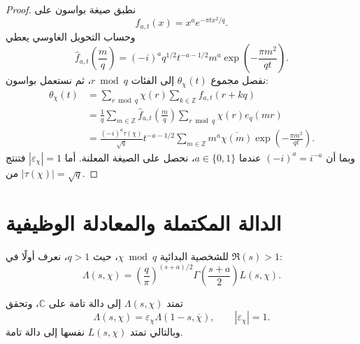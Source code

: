 \begin{proof}
نطبق صيغة بواسون على
\[
f_{a,t}(x)=x^a e^{-\pi tx^2/q}.
\]
وحساب التحويل الغاوسي يعطي
\[
\widehat f_{a,t}\!\left(\frac mq\right)
=
(-i)^a q^{1/2}t^{-a-1/2}m^a
\exp\!\left(-\frac{\pi m^2}{qt}\right).
\]
نفصل مجموع \(\theta_\chi(t)\) إلى الفئات \(r\bmod q\)، ثم نستعمل
بواسون:
\begin{align*}
\theta_\chi(t)
&=
\sum_{r\bmod q}\chi(r)
\sum_{k\in\mathbb Z}f_{a,t}(r+kq)\\
&=
\frac1q\sum_{m\in\mathbb Z}
\widehat f_{a,t}\!\left(\frac mq\right)
\sum_{r\bmod q}\chi(r)e_q(mr)\\
&=
\frac{(-i)^a\tau(\chi)}{\sqrt q}
 t^{-a-1/2}
\sum_{m\in\mathbb Z}m^a\overline{\chi(m)}
\exp\!\left(-\frac{\pi m^2}{qt}\right).
\end{align*}
وبما أن \((-i)^a=i^{-a}\) عندما \(a\in\{0,1\}\)، نحصل على الصيغة
المعلنة. أما \(|\varepsilon_\chi|=1\) فتنتج من
\(|\tau(\chi)|=\sqrt q\).
\end{proof}

\section{الدالة المكتملة والمعادلة الوظيفية}

للشخصية البدائية \(\chi\bmod q\)، حيث \(q>1\)، نعرف أولًا في
\(\Re(s)>1\):
\[
\Lambda(s,\chi)
=
\left(\frac q\pi\right)^{(s+a)/2}
\Gamma\!\left(\frac{s+a}{2}\right)L(s,\chi).
\]

\begin{theorem}
\label{thm:primitive-l-functional-equation}
\provedhere
تمتد \(\Lambda(s,\chi)\) إلى دالة تامة على \(\mathbb C\)، وتحقق
\[
\Lambda(s,\chi)
=
\varepsilon_\chi
\Lambda(1-s,\overline\chi),
\qquad
|\varepsilon_\chi|=1.
\]
وبالتالي تمتد \(L(s,\chi)\) نفسها إلى دالة تامة.
\end{theorem}

